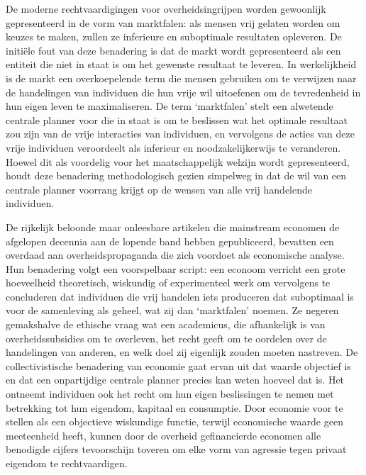 De moderne rechtvaardigingen voor overheidsingrijpen worden gewoonlijk gepresenteerd in de vorm van marktfalen: als mensen vrij gelaten worden om keuzes te maken, zullen ze inferieure en suboptimale resultaten opleveren. De initiële fout van deze benadering is dat de markt wordt gepresenteerd als een entiteit die niet in staat is om het gewenste resultaat te leveren. In werkelijkheid is de markt een overkoepelende term die mensen gebruiken om te verwijzen naar de handelingen van individuen die hun vrije wil uitoefenen om de tevredenheid in hun eigen leven te maximaliseren. De term `marktfalen' stelt een alwetende centrale planner voor die in staat is om te beslissen wat het optimale resultaat zou zijn van de vrije interacties van individuen, en vervolgens de acties van deze vrije individuen veroordeelt als inferieur en noodzakelijkerwijs te veranderen. Hoewel dit als voordelig voor het maatschappelijk welzijn wordt gepresenteerd, houdt deze benadering methodologisch gezien simpelweg in dat de wil van een centrale planner voorrang krijgt op de wensen van alle vrij handelende individuen.

De rijkelijk beloonde maar onleesbare artikelen die mainstream economen de afgelopen decennia aan de lopende band hebben gepubliceerd, bevatten een overdaad aan overheidspropaganda die zich voordoet als economische analyse. Hun benadering volgt een voorspelbaar script: een econoom verricht een grote hoeveelheid theoretisch, wiskundig of experimenteel werk om vervolgens te concluderen dat individuen die vrij handelen iets produceren dat suboptimaal is voor de samenleving als geheel, wat zij dan `marktfalen' noemen. Ze negeren gemakshalve de ethische vraag wat een academicus, die afhankelijk is van overheidssubsidies om te overleven, het recht geeft om te oordelen over de handelingen van anderen, en welk doel zij eigenlijk zouden moeten nastreven. De collectivistische benadering van economie gaat ervan uit dat waarde objectief is en dat een onpartijdige centrale planner precies kan weten hoeveel dat is. Het ontneemt individuen ook het recht om hun eigen beslissingen te nemen met betrekking tot hun eigendom, kapitaal en consumptie. Door economie voor te stellen als een objectieve wiskundige functie, terwijl economische waarde geen meeteenheid heeft, kunnen door de overheid gefinancierde economen alle benodigde cijfers tevoorschijn toveren om elke vorm van agressie tegen privaat eigendom te rechtvaardigen.

